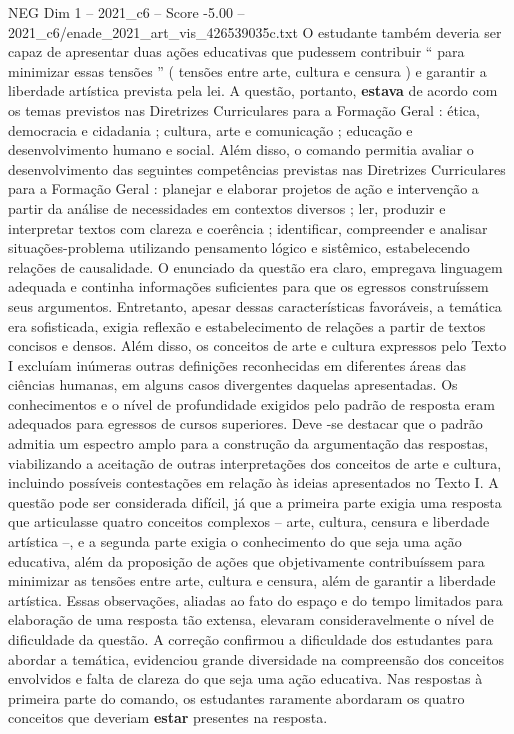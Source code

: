 \begin{textsample}{NEG Dim 1 – 2021\_c6 – Score -5.00 – 2021\_c6/enade\_2021\_art\_vis\_426539035c.txt}
O estudante também deveria ser capaz de apresentar duas ações educativas que pudessem contribuir “ para minimizar essas tensões ” ( tensões entre arte, cultura e censura ) e garantir a liberdade artística prevista pela lei.
A questão, portanto, \textbf{estava} de acordo com os temas previstos nas Diretrizes Curriculares para a Formação Geral : ética, democracia e cidadania ; cultura, arte e comunicação ; educação e desenvolvimento humano e social.
Além disso, o comando permitia avaliar o desenvolvimento das seguintes competências previstas nas Diretrizes Curriculares para a Formação Geral : planejar e elaborar projetos de ação e intervenção a partir da análise de necessidades em contextos diversos ; ler, produzir e interpretar textos com clareza e coerência ; identificar, compreender e analisar situações-problema utilizando pensamento lógico e sistêmico, estabelecendo relações de causalidade.
O enunciado da questão era claro, empregava linguagem adequada e continha informações suficientes para que os egressos construíssem seus argumentos.
Entretanto, apesar dessas características favoráveis, a temática era sofisticada, exigia reflexão e estabelecimento de relações a partir de textos concisos e densos.
Além disso, os conceitos de arte e cultura expressos pelo Texto I excluíam inúmeras outras definições reconhecidas em diferentes áreas das ciências humanas, em alguns casos divergentes daquelas apresentadas.
Os conhecimentos e o nível de profundidade exigidos pelo padrão de resposta eram adequados para egressos de cursos superiores.
Deve -se destacar que o padrão admitia um espectro amplo para a construção da argumentação das respostas, viabilizando a aceitação de outras interpretações dos conceitos de arte e cultura, incluindo possíveis contestações em relação às ideias apresentados no Texto I.
A questão pode ser considerada difícil, já que a primeira parte exigia uma resposta que articulasse quatro conceitos complexos – arte, cultura, censura e liberdade artística –, e a segunda parte exigia o conhecimento do que seja uma ação educativa, além da proposição de ações que objetivamente contribuíssem para minimizar as tensões entre arte, cultura e censura, além de garantir a liberdade artística.
Essas observações, aliadas ao fato do espaço e do tempo limitados para elaboração de uma resposta tão extensa, elevaram consideravelmente o nível de dificuldade da questão.
A correção confirmou a dificuldade dos estudantes para abordar a temática, evidenciou grande diversidade na compreensão dos conceitos envolvidos e falta de clareza do que seja uma ação educativa.
Nas respostas à primeira parte do comando, os estudantes raramente abordaram os quatro conceitos que deveriam \textbf{estar} presentes na resposta.

\end{textsample}
